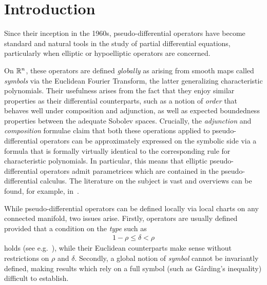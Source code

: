 \chapter{Introduction}

Since their inception in the 1960s,
pseudo-differential operators have become standard and natural tools in the study of partial differential equations,
particularly when elliptic or hypoelliptic operators are concerned.

On $\mathbb{R}^n$,
these operators are defined \emph{globally} as arising from smooth maps called \emph{symbols} via the Euclidean Fourier Transform,
the latter generalizing characteristic polynomials.
Their usefulness arises from the fact that they enjoy similar properties as their differential counterparts,
such as a notion of \emph{order} that behaves well under composition and adjunction,
as well as expected boundedness properties between the adequate Sobolev spaces.
Crucially,
the \emph{adjunction} and \emph{composition} formulae claim that
both these operations applied to pseudo-differential operators can be approximately expressed on the symbolic side via a formula that is formally virtually identical to the corresponding rule for characteristic polynomials.
In particular,
this means that elliptic pseudo-differential operators admit parametrices which are contained in the pseudo-differential calculus.
The literature on the subject is vast and
overviews can be found, for example, in~\cite{Shubin01,Hormander07}.

While pseudo-differential operators can be defined locally via local charts on any connected manifold,
two issues arise.
Firstly,
operators are usually defined provided that a condition on the \emph{type} such as
\begin{align*}
    1 - \rho \leq \delta < \rho
\end{align*}
holds (see e.g.~\cite[Section 4]{Shubin01}),
while their Euclidean counterparts make sense without restrictions on $\rho$ and $\delta$.
Secondly,
a global notion of \emph{symbol} cannot be invariantly defined,
making results which rely on a full symbol (such as Gårding's inequality) difficult to establish.

